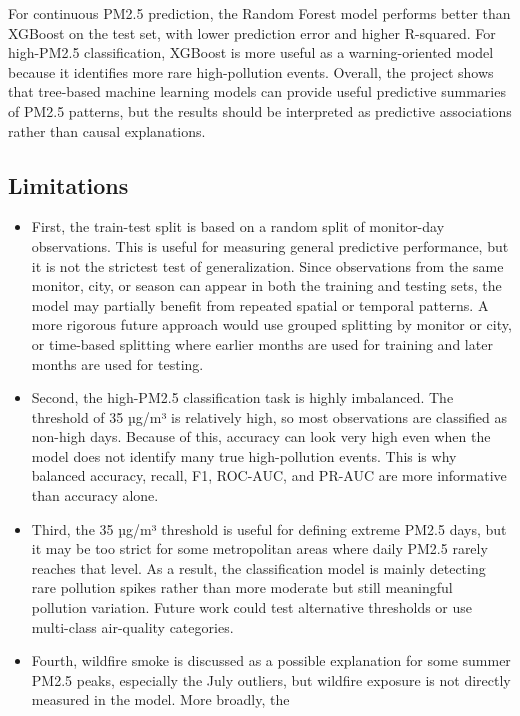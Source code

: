 \documentclass[
  letterpaper,
  DIV=11,
  numbers=noendperiod]{scrartcl}
\begin{document}
For continuous PM2.5 prediction, the Random Forest model performs better
than XGBoost on the test set, with lower prediction error and higher
R-squared. For high-PM2.5 classification, XGBoost is more useful as a
warning-oriented model because it identifies more rare high-pollution
events. Overall, the project shows that tree-based machine learning
models can provide useful predictive summaries of PM2.5 patterns, but
the results should be interpreted as predictive associations rather than
causal explanations.

\subsection{Limitations}\label{limitations}

\begin{itemize}
\item
  First, the train-test split is based on a random split of monitor-day
  observations. This is useful for measuring general predictive
  performance, but it is not the strictest test of generalization. Since
  observations from the same monitor, city, or season can appear in both
  the training and testing sets, the model may partially benefit from
  repeated spatial or temporal patterns. A more rigorous future approach
  would use grouped splitting by monitor or city, or time-based
  splitting where earlier months are used for training and later months
  are used for testing.
\item
  Second, the high-PM2.5 classification task is highly imbalanced. The
  threshold of 35 µg/m³ is relatively high, so most observations are
  classified as non-high days. Because of this, accuracy can look very
  high even when the model does not identify many true high-pollution
  events. This is why balanced accuracy, recall, F1, ROC-AUC, and PR-AUC
  are more informative than accuracy alone.
\item
  Third, the 35 µg/m³ threshold is useful for defining extreme PM2.5
  days, but it may be too strict for some metropolitan areas where daily
  PM2.5 rarely reaches that level. As a result, the classification model
  is mainly detecting rare pollution spikes rather than more moderate
  but still meaningful pollution variation. Future work could test
  alternative thresholds or use multi-class air-quality categories.
\item
  Fourth, wildfire smoke is discussed as a possible explanation for some
  summer PM2.5 peaks, especially the July outliers, but wildfire
  exposure is not directly measured in the model. More broadly, the

\end{itemize}
\end{document}
